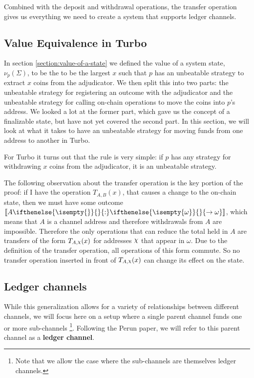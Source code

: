\documentclass{article}
\DeclareRobustCommand{\rchi}{{\mathpalette\irchi\relax}}
\newcommand{\irchi}[2]{\raisebox{\depth}{$#1\chi$}} %
\theoremstyle{definition}
\newcommand{\adj}[1]{\llbracket #1 \rrbracket}
\newcommand{\holds}[3]{#1 %
  \ifthenelse{\isempty{#2}}{}{: #2} %
  \ifthenelse{\isempty{#3}}{}{\rightarrow #3} %
}
\begin{document}
Combined with the deposit and withdrawal operations, the transfer operation gives us everything we need to create a system that supports ledger channels.

\subsection{Value Equivalence in Turbo}

In section \ref{section:value-of-a-state} we defined the value of a system state, $\nu_p(\Sigma)$, to be the to be the largest $x$ such that $p$ has an unbeatable strategy to extract $x$ coins from the adjudicator.
We then split this into two parts: the unbeatable strategy for registering an outcome with the adjudicator and the unbeatable strategy for calling on-chain operations to move the coins into $p$'s address.
We looked a lot at the former part, which gave us the concept of a finalizable state,
but have not yet covered the second part.
In this section, we will look at what it takes to have an unbeatable strategy for moving funds from one address to another in Turbo.

For Turbo it turns out that the rule is very simple: if $p$ has any strategy for withdrawing $x$ coins from the adjudicator, it is an unbeatable strategy.

The following observation about the transfer operation is the key portion of the proof:
if I have the operation $T_{A, B}(x)$, that causes a change to the on-chain state,
then we must have some outcome $\adj{\holds{A}{}{\omega}}$, which means that $A$ is a channel address and therefore withdrawals from $A$ are impossible.
Therefore the only operations that can reduce the total held in $A$ are transfers of the form $T_{A, \rchi}(x)$ for addresses $\rchi$ that appear in $\omega$.
Due to the definition of the transfer operation, all operations of this form commute.
So no transfer operation inserted in front of $T_{A, \rchi}(x)$ can change its effect on the state.

\subsection{Ledger channels}

While this generalization allows for a variety of relationships between different channels,
we will focus here on a setup where a single parent channel funds one or more sub-channels
\footnote{Note that we allow the case where the sub-channels are themselves ledger channels.}.
Following the Perun paper, we will refer to this parent channel as a \textbf{ledger channel}.
\end{document}
